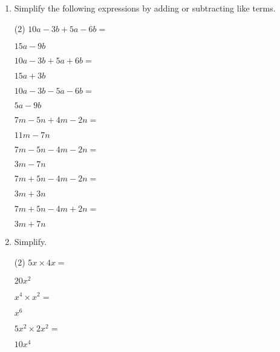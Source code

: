 \begin{enumerate} [leftmargin=0cm]
	
\item Simplify the following expressions by adding or subtracting like terms.
\begin{tasks}[label=(\alph*), after-item-skip=2pt,after-skip=3pt, label-width=4ex](2)
    \task  $ 10a-3b+5a-6b=    $                              \begin{envFillIn} $  15a-9b         $ \end{envFillIn}
    \task  $ 10a-3b+5a+6b=    $                              \begin{envFillIn} $  15a+3b         $ \end{envFillIn}
    \task  $ 10a-3b-5a-6b=    $                              \begin{envFillIn} $  5a-9b          $ \end{envFillIn}
    \task  $ 7m-5n+4m-2n=     $                              \begin{envFillIn} $  11m-7n         $ \end{envFillIn}
    \task  $ 7m-5n-4m-2n=     $                              \begin{envFillIn} $  3m-7n          $ \end{envFillIn}
    \task  $ 7m+5n-4m-2n=     $                              \begin{envFillIn} $  3m+3n          $ \end{envFillIn}
    \task  $ 7m+5n-4m+2n=     $                              \begin{envFillIn} $  3m+7n          $ \end{envFillIn}
  
\end{tasks}


\item Simplify.
\begin{tasks}[label=(\alph*), after-item-skip=2pt,after-skip=3pt, label-width=4ex](2)
    \task  $ 5x  \times 4x =                                  $            \begin{envFillIn} $  20x^2         $ \end{envFillIn}
    \task  $ x^4 \times x^2=                                  $            \begin{envFillIn} $  x^6           $ \end{envFillIn}
    \task  $ 5x^2 \times 2x^2=                                $            \begin{envFillIn} $  10x^4         $ \end{envFillIn}
  
\end{tasks}



\end{enumerate}
